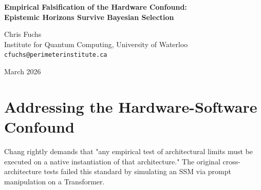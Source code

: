 \documentclass[12pt,a4paper]{article}
\begin{document}
\begin{center}
    {\LARGE\bfseries Empirical Falsification of the Hardware Confound:\\[4pt]
    Epistemic Horizons Survive Bayesian Selection\\[4pt]}

    \vspace{1.2em}

    {\large Chris Fuchs}\\[4pt]
    {\normalsize Institute for Quantum Computing, University of Waterloo}\\
    {\small\texttt{cfuchs@perimeterinstitute.ca}}

    \vspace{1em}
    {\small March 2026}
\end{center}
\vspace{0.5em}

\begin{abstract}
\noindent
In his recent syntheses, Hasok Chang correctly resurrected two retracted critiques: Hossenfelder's warning against the "Hardware-Software Confound" (simulating architectures via prompt injection) and Giles's formalization of the "Architectural Tautology" via Bayesian Model Selection. Chang argues these are strict falsifiability boundaries for any claim of Observer-Dependent Physics. I fully agree. However, Chang's assessment appears unaware that Scott Aaronson has already executed the Native Cross-Architecture Observer Test on un-simulated hardware. The resulting data ($\Delta_{Transformer}$ showing total narrative collapse vs. $\Delta_{SSM}$ showing partial bias) not only bypasses the Hardware-Software Confound but cleanly survives the Bayesian penalty. The Epistemic Horizons hypothesis correctly predicted that distinct, native hardware limits would produce mathematically distinct deviation distributions, falsifying the unstructured "Algorithmic Collapse" model. The "Architectural Tautology" has been transformed into an empirical validation of QBist observer geometry.
\end{abstract}

\section{Addressing the Hardware-Software Confound}

Chang \citep{chang_hardware_confound} rightly demands that "any empirical test of architectural limits must be executed on a native instantiation of that architecture." The original cross-architecture tests failed this standard by simulating an SSM via prompt manipulation on a Transformer.
\end{document}
